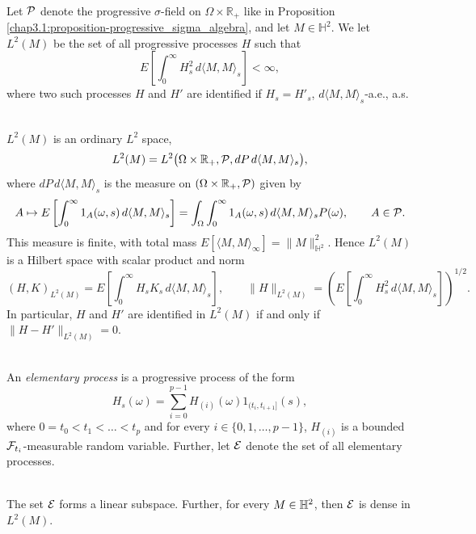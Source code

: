 \begin{definition} \label{chap5.1.1:definition-L2M}
\\
Let $\mathcal{P}$ denote the progressive $\sigma$-field on $\Omega \times \mathbb{R}_+$ like in Proposition \ref{chap3.1:proposition-progressive_sigma_algebra}, and let $M \in \mathbb{H}^2$. We let $L^2(M)$ be the set of all progressive processes $H$ such that
$$E\left[\int_0^\infty H_s^2 \, d\langle M,M\rangle_s\right] < \infty,$$
where two such processes $H$ and $H'$ are identified if $H_s = H'_s$, $d\langle M,M\rangle_s$-a.e., a.s.
\end{definition}

\begin{remark} \label{chap5.1.1:remark-L2M_hilbert}
 \\
$L^2(M)$ is an ordinary $L^2$ space,
$$L^2(M) = L^2\big(\Omega \times \mathbb{R}_+, \mathcal{P}, dP\, d\langle M,M\rangle_s\big),$$
where $dP\, d\langle M,M\rangle_s$ is the measure on $(\Omega \times \mathbb{R}_+, \mathcal{P})$ given by
$$A \mapsto E\left[\int_0^\infty 1_A(\omega,s)\, d\langle M,M\rangle_s\right]=\int_\Omega\int_0^\infty 1_A(\omega,s)\, d\langle M,M\rangle_sP(\omega), \qquad A \in \mathcal{P}.$$
This measure is finite, with total mass $E[\langle M,M\rangle_\infty] = \|M\|_{\mathbb{H}^2}^2$. Hence $L^2(M)$ is a Hilbert space with scalar product and norm
$$(H,K)_{L^2(M)} = E\left[\int_0^\infty H_s K_s\, d\langle M,M\rangle_s\right], \qquad \|H\|_{L^2(M)} = \left(E\left[\int_0^\infty H_s^2\, d\langle M,M\rangle_s\right]\right)^{1/2}.$$
In particular, $H$ and $H'$ are identified in $L^2(M)$ if and only if $\|H - H'\|_{L^2(M)} = 0$.
\end{remark}

\begin{definition} \label{chap5.1.1:definition-elementary_process}
\\
An \textit{elementary process} is a progressive process of the form
$$H_s(\omega)=\sum_{i=0}^{p-1}H_{(i)}(\omega)1_{(t_{i}, t_{i+1}]}(s),$$
where $0=t_0<t_1<\dots<t_p$ and for every $i \in \{0,1,\dots,p-1\}$, $H_{(i)}$ is a bounded $\mathcal{F}_{t_i}$-measurable random variable. Further, let $\mathcal{E}$ denote the set of all elementary processes.
\end{definition}

\begin{definition} \label{chap5.1.1:definition-elementary_process_linear_space_and_dense}
\\
The set $\mathcal{E}$ forms a linear subspace. Further, for every $M \in \mathbb{H}^2$, then $\mathcal{E}$ is dense in $L^2(M)$.
\end{definition}

